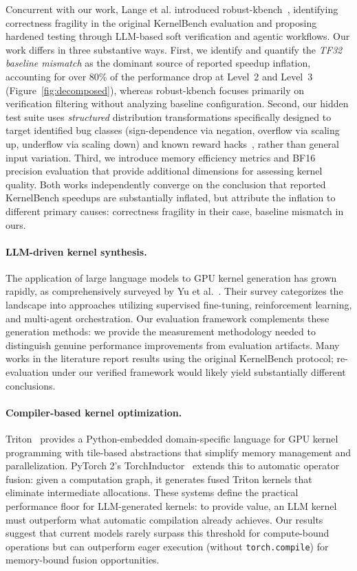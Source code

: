 \documentclass[11pt]{article}
\begin{document}
Concurrent with our work, Lange et al. introduced robust-kbench~\cite{robustkbench}, identifying correctness fragility in the original KernelBench evaluation and proposing hardened testing through LLM-based soft verification and agentic workflows.
Our work differs in three substantive ways. First, we identify and quantify the \emph{TF32 baseline mismatch} as the dominant source of reported speedup inflation, accounting for over 80\% of the performance drop at Level~2 and Level~3 (Figure~\ref{fig:decomposed}), whereas robust-kbench focuses primarily on verification filtering without analyzing baseline configuration.
Second, our hidden test suite uses \emph{structured} distribution transformations specifically designed to target identified bug classes (sign-dependence via negation, overflow via scaling up, underflow via scaling down) and known reward hacks~\cite{kernelarena2026resources}, rather than general input variation.
Third, we introduce memory efficiency metrics and BF16 precision evaluation that provide additional dimensions for assessing kernel quality.
Both works independently converge on the conclusion that reported KernelBench speedups are substantially inflated, but attribute the inflation to different primary causes: correctness fragility in their case, baseline mismatch in ours.

\paragraph{LLM-driven kernel synthesis.}
The application of large language models to GPU kernel generation has grown rapidly, as comprehensively surveyed by Yu et al.~\cite{yu2026automated}. Their survey categorizes the landscape into approaches utilizing supervised fine-tuning, reinforcement learning, and multi-agent orchestration.
Our evaluation framework complements these generation methods: we provide the measurement methodology needed to distinguish genuine performance improvements from evaluation artifacts.
Many works in the literature report results using the original KernelBench protocol;
re-evaluation under our verified framework would likely yield substantially different conclusions.

\paragraph{Compiler-based kernel optimization.}
Triton~\cite{triton} provides a Python-embedded domain-specific language for GPU kernel programming with tile-based abstractions that simplify memory management and parallelization.
PyTorch 2's TorchInductor~\cite{torchinductor} extends this to automatic operator fusion: given a computation graph, it generates fused Triton kernels that eliminate intermediate allocations.
These systems define the practical performance floor for LLM-generated kernels: to provide value, an LLM kernel must outperform what automatic compilation already achieves.
Our results suggest that current models rarely surpass this threshold for compute-bound operations but can outperform eager execution (without \texttt{torch.compile}) for memory-bound fusion opportunities.
\end{document}
